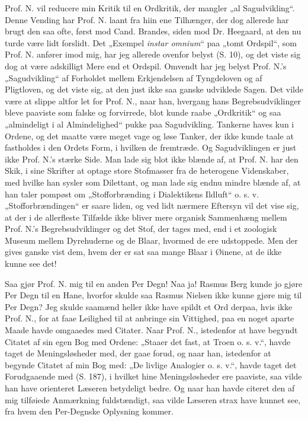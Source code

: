\documentclass[12pt,a4paper]{book}
\newcommand{\opage}[1]{\marginnote{\footnotesize\textit{[#1]}}}
\begin{document}
Prof. N. vil reducere min Kritik til en Ordkritik, der mangler „al
Sagudvikling“. Denne Vending har Prof. N. laant fra hiin ene Tilhænger, der dog
allerede har brugt den saa ofte, først mod Cand. Brandes, siden mod Dr. Heegaard,
at den nu turde være lidt forslidt. Det „Exempel \textit{instar omnium}“ paa
„tomt Ordspil“, som Prof. N. anfører imod mig, har jeg allerede ovenfor belyst
(S. 10), og det viste sig dog at være adskilligt Mere end et Ordspil. Omvendt har
jeg belyst Prof. N.'s „Sagudvikling“ af Forholdet mellem Erkjendelsen af
Tyngdeloven og af Pligtloven, og det viste sig, at den just ikke saa ganske
udviklede Sagen. Det vilde være at slippe altfor let for Prof. N., naar han,
hvergang hans Begrebsudviklinger bleve paaviste som falske og forvirrede, blot
kunde raabe „Ordkritik“ og saa „almindeligt i al Almindelighed“ pukke paa
Sagudvikling. Tankerne haves kun i Ordene, og det maatte være meget vage og løse
Tanker, der ikke kunde taale at fastholdes i den Ordets Form, i hvilken de
fremtræde. Og Sagudviklingen er just ikke Prof. N.'s stærke Side. Man lade sig
blot ikke blænde af, at Prof. N.
\opage{19} har den Skik, i sine Skrifter at optage store Stofmasser fra de heterogene
Videnskaber, med hvilke han sysler som Dilettant, og man lade sig endnu mindre
blænde af, at han taler pompøst om „Stofforbrænding i Dialektikens Ildluft“
o. s. v. „Stofforbrændingen“ er saare liden, og ved lidt nærmere Eftersyn vil det
vise sig, at der i de allerfleste Tilfælde ikke bliver mere organisk Sammenhæng
mellem Prof. N.'s Begrebsudviklinger og det Stof, der tages med, end i et
zoologisk Museum mellem Dyrehuderne og de Blaar, hvormed de ere udstoppede. Men
der gives ganske vist dem, hvem der er sat saa mange Blaar i Øinene, at de ikke
kunne see det!

Saa gjør Prof. N. mig til en anden Per Degn! Naa ja! Rasmus Berg kunde jo gjøre
Per Degn til en Hane, hvorfor skulde saa Rasmus Nielsen ikke kunne gjøre mig til
Per Degn? Jeg skulde saamænd heller ikke have spildt et Ord derpaa, hvis ikke
Prof. N., for at faae Leilighed til at anbringe sin Vittighed, paa en noget
aparte Maade havde omgaaedes med Citater. Naar Prof. N., istedenfor at have
begyndt Citatet af sin egen Bog med Ordene: „Staaer det fast, at Troen o. s. v.“,
havde taget de Meningsløsheder med, der gaae forud, og naar han, istedenfor at
begynde Citatet af min Bog med: „De livlige Analogier o. s. v.“, havde taget det
Forudgaaende med (S. 187), i hvilket hine Meningsløsheder ere paaviste, saa vilde
han have orienteret Læseren betydeligt bedre. Og naar han havde citeret den af
mig tilføiede Anmærkning fuldstændigt, saa vilde Læseren strax have kunnet see,
fra hvem den Per-Degnske Oplysning kommer.
\end{document}
